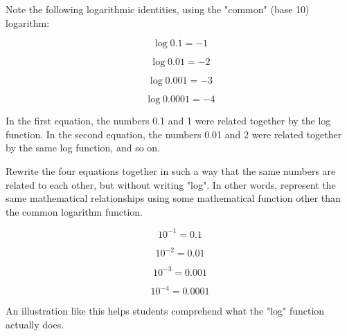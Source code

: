 

Note the following logarithmic identities, using the "common" (base 10) logarithm:

$$\log 0.1 = -1$$

$$\log 0.01 = -2$$

$$\log 0.001 = -3$$

$$\log 0.0001 = -4$$

In the first equation, the numbers 0.1 and 1 were related together by the log function.  In the second equation, the numbers 0.01 and 2 were related together by the same log function, and so on.

Rewrite the four equations together in such a way that the same numbers are related to each other, but without writing "log".  In other words, represent the same mathematical relationships using some mathematical function other than the common logarithm function.







$$10^{-1} = 0.1$$

$$10^{-2} = 0.01$$

$$10^{-3} = 0.001$$

$$10^{-4} = 0.0001$$







An illustration like this helps students comprehend what the "log" function actually does.




